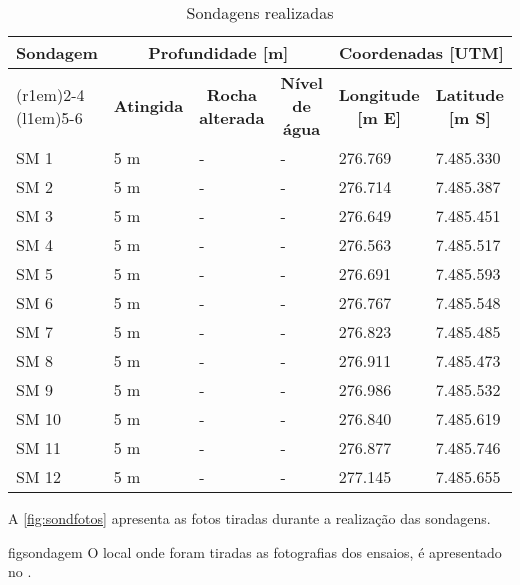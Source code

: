 \begin{table}[htb!]
	\renewcommand{\multirowsetup}{\centering}
	\renewcommand\tabularxcolumn[1]{m{#1}}
	\centering
	\caption{Sondagens realizadas}
	\label{tab:sondspec}
	\begin{tabularx}{\textwidth}{l X X X X X}
		\toprule
		\multirow{3}{*}{\textbf{Sondagem}} & 
		\multicolumn{3}{c}{\textbf{Profundidade [m]}} &
		\multicolumn{2}{c}{\textbf{Coordenadas [UTM]}}\\
		\cmidrule(r{1em}){2-4}
		\cmidrule(l{1em}){5-6}
		&
		\multicolumn{1}{c}{\textbf{Atingida}} &
		\multicolumn{1}{c}{\textbf{Rocha alterada}} &
		\multicolumn{1}{c}{\textbf{Nível de água}} &
		\multicolumn{1}{c}{\textbf{Longitude [m E]}} &
		\multicolumn{1}{c}{\textbf{Latitude [m S]}} \\
		\midrule
SM  1 & 5 m & - & - & 276.769 & 7.485.330\\
SM  2 & 5 m & - & - & 276.714 & 7.485.387\\
SM  3 & 5 m & - & - & 276.649 & 7.485.451\\
SM  4 & 5 m & - & - & 276.563 & 7.485.517\\
SM  5 & 5 m & - & - & 276.691 & 7.485.593\\
SM  6 & 5 m & - & - & 276.767 & 7.485.548\\
SM  7 & 5 m & - & - & 276.823 & 7.485.485\\
SM  8 & 5 m & - & - & 276.911 & 7.485.473\\
SM  9 & 5 m & - & - & 276.986 & 7.485.532\\
SM 10 & 5 m & - & - & 276.840 & 7.485.619\\
SM 11 & 5 m & - & - & 276.877 & 7.485.746\\
SM 12 & 5 m & - & - & 277.145 & 7.485.655\\
		\bottomrule		
	\end{tabularx}
\end{table}
\FloatBarrier


A \cref{fig:sondfotos} apresenta as fotos tiradas
durante a realização das sondagens.

{figsondagem}
\FloatBarrier
O local onde foram tiradas as fotografias
dos ensaios, é apresentado no .
